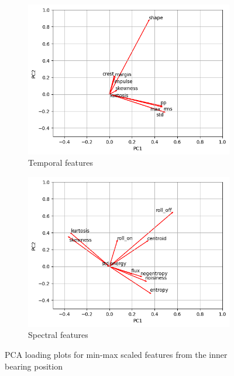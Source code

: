 \begin{figure}[h!]
    \centering
    \begin{subfigure}[b]{0.49\textwidth}
        \includegraphics[width=\textwidth]{assets/design/pca-loading-plot-temporal.png}
        \caption{Temporal features}
    \end{subfigure}
    \hfill
    \begin{subfigure}[b]{0.49\textwidth}
        \includegraphics[width=\textwidth]{assets/design/pca-loading-plot-spectral.png}
        \caption{Spectral features}
    \end{subfigure}
    \caption{PCA loading plots for min-max scaled features from the inner bearing position}
    \label{fig:design:pca-loading-plot} 
\end{figure}

